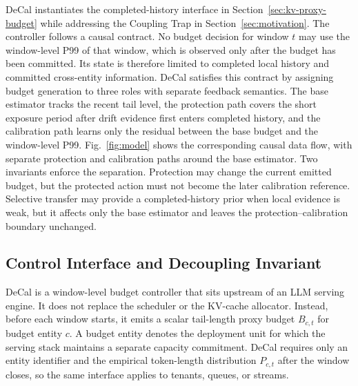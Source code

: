 \documentclass[sigplan,10pt, anonymous]{acmart}
\begin{document}
DeCal instantiates the completed-history interface in Section~\ref{sec:kv-proxy-budget} while addressing the Coupling Trap in Section~\ref{sec:motivation}. The controller follows a causal contract. No budget decision for window $t$ may use the window-level P99 of that window, which is observed only after the budget has been committed. Its state is therefore limited to completed local history and committed cross-entity information. DeCal satisfies this contract by assigning budget generation to three roles with separate feedback semantics. The base estimator tracks the recent tail level, the protection path covers the short exposure period after drift evidence first enters completed history, and the calibration path learns only the residual between the base budget and the window-level P99. Fig.~\ref{fig:model} shows the corresponding causal data flow, with separate protection and calibration paths around the base estimator. Two invariants enforce the separation. Protection may change the current emitted budget, but the protected action must not become the later calibration reference. Selective transfer may provide a completed-history prior when local evidence is weak, but it affects only the base estimator and leaves the protection--calibration boundary unchanged.




\subsection{Control Interface and Decoupling Invariant}
\label{sec:control-interface}

DeCal is a window-level budget controller that sits upstream of an LLM serving engine. It does not replace the scheduler or the KV-cache allocator. Instead, before each window starts, it emits a scalar tail-length proxy budget $B_{c,t}$ for budget entity $c$. A budget entity denotes the deployment unit for which the serving stack maintains a separate capacity commitment. DeCal requires only an entity identifier and the empirical token-length distribution $P_{c,t}$ after the window closes, so the same interface applies to tenants, queues, or streams.
\end{document}
